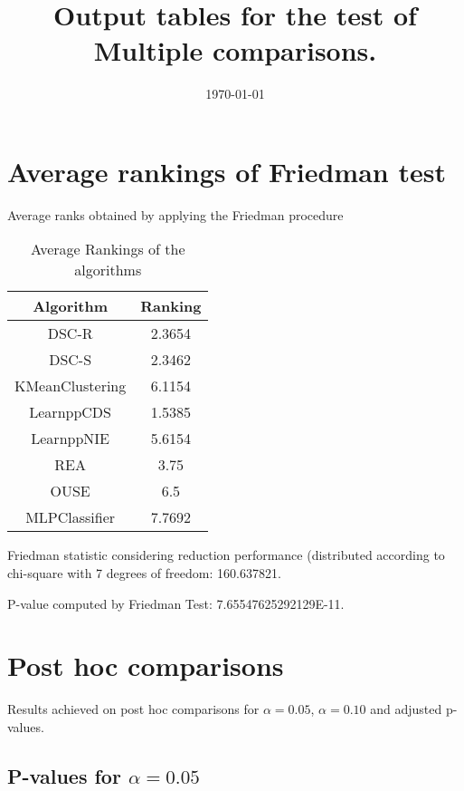\documentclass[a4paper,10pt]{article}
\title{Output tables for the test of Multiple comparisons.}
\author{}
\date{\today}
\begin{document}
\begin{landscape}
\pagestyle{empty}
\maketitle
\thispagestyle{empty}
\section{Average rankings of Friedman test}



Average ranks obtained by applying the Friedman procedure

\begin{table}[!htp]
\centering
\begin{tabular}{|c|c|}\hline
Algorithm&Ranking\\\hline
DSC-R & 2.3654\\
DSC-S & 2.3462\\
KMeanClustering & 6.1154\\
LearnppCDS & 1.5385\\
LearnppNIE & 5.6154\\
REA & 3.75\\
OUSE & 6.5\\
MLPClassifier & 7.7692\\
\hline
\end{tabular}
\caption{Average Rankings of the algorithms}
\end{table}

Friedman statistic considering reduction performance (distributed according to chi-square with 7 degrees of freedom: 160.637821.

P-value computed by Friedman Test: 7.65547625292129E-11.\newline



\pagebreak

\section{Post hoc comparisons}

Results achieved on post hoc comparisons for $\alpha = 0.05$, $\alpha = 0.10$ and adjusted p-values.

\subsection{P-values for $\alpha=0.05$}


\end{landscape}
\end{document}
